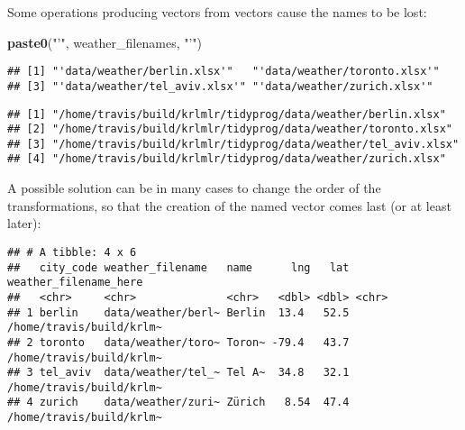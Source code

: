 \documentclass[]{book}
\newenvironment{Shaded}{\begin{snugshade}}{\end{snugshade}}
\newcommand{\DataTypeTok}[1]{\textcolor[rgb]{0.13,0.29,0.53}{#1}}
\newcommand{\KeywordTok}[1]{\textcolor[rgb]{0.13,0.29,0.53}{\textbf{#1}}}
\newcommand{\NormalTok}[1]{#1}
\newcommand{\OperatorTok}[1]{\textcolor[rgb]{0.81,0.36,0.00}{\textbf{#1}}}
\newcommand{\StringTok}[1]{\textcolor[rgb]{0.31,0.60,0.02}{#1}}
\begin{document}
Some operations producing vectors from vectors cause the names to be lost:

\begin{Shaded}
\begin{Highlighting}[]
\KeywordTok{paste0}\NormalTok{(}\StringTok{"'"}\NormalTok{, weather_filenames, }\StringTok{"'"}\NormalTok{)}
\end{Highlighting}
\end{Shaded}

\begin{verbatim}
## [1] "'data/weather/berlin.xlsx'"   "'data/weather/toronto.xlsx'" 
## [3] "'data/weather/tel_aviv.xlsx'" "'data/weather/zurich.xlsx'"
\end{verbatim}

\begin{Shaded}
\end{Shaded}

\begin{verbatim}
## [1] "/home/travis/build/krlmlr/tidyprog/data/weather/berlin.xlsx"  
## [2] "/home/travis/build/krlmlr/tidyprog/data/weather/toronto.xlsx" 
## [3] "/home/travis/build/krlmlr/tidyprog/data/weather/tel_aviv.xlsx"
## [4] "/home/travis/build/krlmlr/tidyprog/data/weather/zurich.xlsx"
\end{verbatim}

A possible solution can be in many cases to change the order of the transformations, so that the creation of the named vector comes last (or at least later):

\begin{Shaded}
\end{Shaded}

\begin{verbatim}
## # A tibble: 4 x 6
##   city_code weather_filename   name      lng   lat weather_filename_here   
##   <chr>     <chr>              <chr>   <dbl> <dbl> <chr>                   
## 1 berlin    data/weather/berl~ Berlin  13.4   52.5 /home/travis/build/krlm~
## 2 toronto   data/weather/toro~ Toron~ -79.4   43.7 /home/travis/build/krlm~
## 3 tel_aviv  data/weather/tel_~ Tel A~  34.8   32.1 /home/travis/build/krlm~
## 4 zurich    data/weather/zuri~ Zürich   8.54  47.4 /home/travis/build/krlm~
\end{verbatim}
\end{document}
